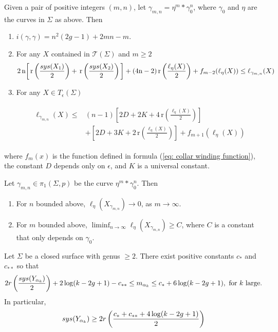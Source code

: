 \documentclass[10pt,a4paper]{amsart}
\begin{document}
\begin{prop} \label{prop: separating}
Given a pair of positive integers $(m,n)$, let $\gamma_{m,n}= \eta^{m}\ast  \gamma_{0}^{n}$, where $\gamma_0$ and $\eta$ are the curves in $\Sigma$ as above.  
Then 
\begin{enumerate}
\item  $i(\gamma,\gamma)=
n^{2}(2g - 1) + 2mn - m$.
\item   For any  $X$  contained 
in  $\mathcal{T}(\Sigma)$ and $m \geq 2$
$$ 2 \, \text{n} \bigg[ \, \text{r} \left(\frac{\textup{sys}(X_{1})} {2}\right)+ \, \text{r} \left(\frac{\textup{sys}(X_{2})} {2}\right)\bigg]   +  ( 4\text{n}-2) \, \text{r} \left(\frac{\ell_{\eta} (X)} {2}\right) + f_{m-2}(\ell_{\eta}(X)) \leq \ell_{\gamma_{m,n}}(X) $$

 \item   For any $X \in T_{\epsilon}(\Sigma)$
  
   
\begin{align*}
 \begin{split}
    \ell_{\gamma_{m,n}}(X) \leq & 
 (n-1)\left[2D+ 2K +4\, \text{r}\left(\frac{\ell_{\eta}(X)}{2}\right)   \right]\\
    &+\left[2D+ 3K +2\, \text{r}\left(\frac{\ell_{\eta}(X)}{2}\right)   \right]+ f_{m+1}(\ell_{\eta}(X))
    \end{split}
 \end{align*}

\end{enumerate}
where $f_{m}(x)$ is the function defined in formula 
(\ref{eq: collar winding function}),  the constant $D$ depends only on  $\epsilon$, and $K$ is a universal constant.
\end{prop}

\begin{lem}\label{lem:etagoestozero} 
Let $\gamma_{m,n} \in \pi_1 (\Sigma,p)$
be the curve $\eta^{m}\ast  \gamma_{0}^{n}$. Then
\begin{enumerate}
\item  For $n$ bounded above, $\ell_{\eta}(X_{\gamma_{m,n}}) \rightarrow 0$, as $m \rightarrow \infty$.
\item For $m$ bounded above, 
$\liminf_{n \rightarrow \infty} \ell_{\eta}(X_{\gamma_{m,n}}) \geq C$, where $C$ is a constant that only depends on $\gamma_{0}$.
\end{enumerate}
\end{lem}

\begin{prop} \label{prop: bounds on alpha}
Let $\Sigma$ be a closed surface with genus $\geq 2$. There exist positive  constants $c_{*}$ and $c_{**}$  so that 
$$ 2 r\left(\frac{\textup{sys}(Y_{\alpha_k})}{2}\right) + 2 \log (k-2g+1) -c_{**}
\leq m_{\alpha_{k}} \leq   c_* + 6 \log (k-2g+1) ,
 \text{ for $k$ large}.$$
 In particular,  
 \begin{align}
 \textup{sys}(Y_{\alpha_k}) \geq  
 2r \left(\frac{c_* +c_{**}+ 4\log (k-2g+1)}{2}\right)
 \end{align}
\end{prop} 
\end{document}
